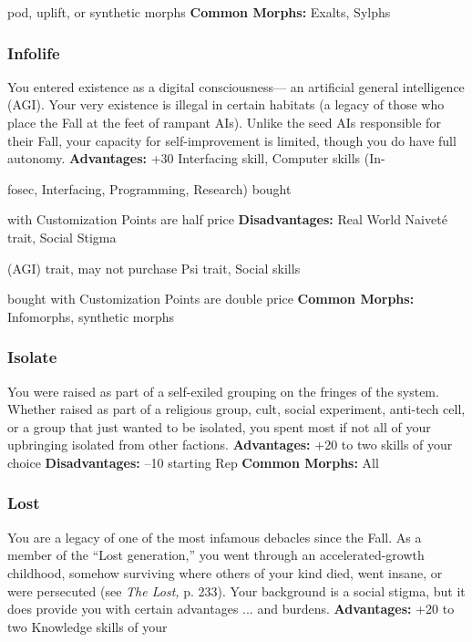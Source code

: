 pod, uplift, or synthetic morphs
\textbf{Common Morphs:} Exalts, Sylphs

\subsubsection{Infolife}

You entered existence as a digital consciousness—
an artificial general intelligence (AGI). Your very 
existence is illegal in certain habitats (a legacy of 
those who place the Fall at the feet of rampant AIs). 
Unlike the seed AIs responsible for their Fall, your 
capacity for self-improvement is limited, though you 
do have full autonomy.
\textbf{Advantages:} +30 Interfacing skill, Computer skills (In-

fosec, Interfacing, Programming, Research) bought 

with Customization Points are half price
\textbf{Disadvantages:} Real World Naiveté trait, Social Stigma 

(AGI) trait, may not purchase Psi trait, Social skills 

bought with Customization Points are double price
\textbf{Common Morphs:} Infomorphs, synthetic morphs

\subsubsection{Isolate}

You were raised as part of a self-exiled grouping on 
the fringes of the system. Whether raised as part of 
a religious group, cult, social experiment, anti-tech 
cell, or a group that just wanted to be isolated, you 
spent most if not all of your upbringing isolated 
from other factions.
\textbf{Advantages:} +20 to two skills of your choice
\textbf{Disadvantages:} –10 starting Rep
\textbf{Common Morphs:} All

\subsubsection{Lost}

You are a legacy of one of the most infamous debacles 
since the Fall. As a member of the ``Lost generation,'' 
you went through an accelerated-growth childhood, 
somehow surviving where others of your kind died, 
went insane, or were persecuted (see \textit{The Lost,} p. 233). 
Your background is a social stigma, but it does provide 
you with certain advantages ... and burdens.
\textbf{Advantages:  }+20 to two Knowledge skills of your 

